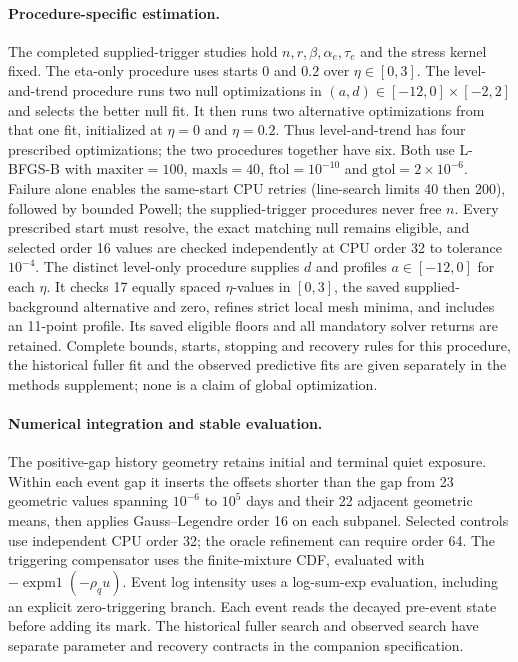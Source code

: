 \paragraph{Procedure-specific estimation.}
The completed supplied-trigger studies hold \(n,r,\beta,\alpha_e,\tau_e\) and the stress kernel fixed. The eta-only procedure uses starts \(0\) and \(0.2\) over \(\eta\in[0,3]\). The level-and-trend procedure runs two null optimizations in \((a,d)\in[-12,0]\times[-2,2]\) and selects the better null fit. It then runs two alternative optimizations from that one fit, initialized at \(\eta=0\) and \(\eta=0.2\). Thus level-and-trend has four prescribed optimizations; the two procedures together have six. Both use L-BFGS-B with \(\mathrm{maxiter}=100\), \(\mathrm{maxls}=40\), \(\mathrm{ftol}=10^{-10}\) and \(\mathrm{gtol}=2\times10^{-6}\). Failure alone enables the same-start CPU retries (line-search limits 40 then 200), followed by bounded Powell; the supplied-trigger procedures never free \(n\). Every prescribed start must resolve, the exact matching null remains eligible, and selected order 16 values are checked independently at CPU order 32 to tolerance \(10^{-4}\).
The distinct level-only procedure supplies \(d\) and profiles \(a\in[-12,0]\) for each \(\eta\). It checks 17 equally spaced \(\eta\)-values in \([0,3]\), the saved supplied-background alternative and zero, refines strict local mesh minima, and includes an 11-point profile. Its saved eligible floors and all mandatory solver returns are retained. Complete bounds, starts, stopping and recovery rules for this procedure, the historical fuller fit and the observed predictive fits are given separately in the methods supplement; none is a claim of global optimization.

\paragraph{Numerical integration and stable evaluation.}
The positive-gap history geometry retains initial and terminal quiet exposure. Within each event gap it inserts the offsets shorter than the gap from 23 geometric values spanning \(10^{-6}\) to \(10^5\) days and their 22 adjacent geometric means, then applies Gauss--Legendre order 16 on each subpanel. Selected controls use independent CPU order 32; the oracle refinement can require order 64. The triggering compensator uses the finite-mixture CDF, evaluated with \(-\operatorname{expm1}(-\rho_q u)\). Event log intensity uses a log-sum-exp evaluation, including an explicit zero-triggering branch. Each event reads the decayed pre-event state before adding its mark. The historical fuller search and observed search have separate parameter and recovery contracts in the companion specification.

